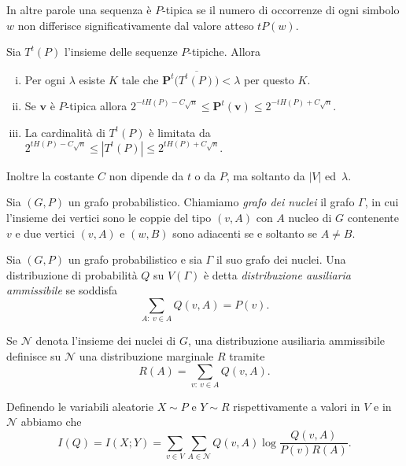 In altre parole una sequenza è \(P\)-tipica se il numero di occorrenze di ogni simbolo \(w\) non differisce significativamente dal valore atteso \(tP(w)\). 
\begin{lemma}
  \label{ptyplemma} Sia \(T^t(P)\) l'insieme delle sequenze \(P\)-tipiche. Allora 
  \begin{enumerate}[(i)]
  \item Per ogni \(\lambda\) esiste \(K\) tale che \(\mathbf{P}^t\big(\overline{T^{t}(P)}\big)<\lambda\) per questo \(K\). 
  \item Se \(\mathbf{v}\) è \(P\)-tipica allora \(2^{-tH(P)-C\sqrt{n}}\le \mathbf{P}^t(\mathbf{v})\le2^{-tH(P)+C\sqrt{n}}.\) 
  \item La cardinalità di \(T^{t}(P)\) è limitata da \(2^{tH(P)-C\sqrt{n}}\le |T^{t}(P)|\le 2^{tH(P)+C\sqrt{n}}.\) 
  \end{enumerate}
  Inoltre la costante \(C\) non dipende da \(t\) o da \(P\), ma soltanto da \(|V|\) ed\ \(\lambda\). 
\end{lemma}
\begin{definition}
  Sia \((G,P)\) un grafo probabilistico. Chiamiamo \emph{grafo dei nuclei} il grafo \(\Gamma\), in cui l'insieme dei vertici sono le coppie del tipo \((v,A)\) con \(A\) nucleo di \(G\) contenente \(v\) e due vertici \((v,A)\) e \((w,B)\) sono adiacenti se e soltanto se \(A\neq B\). 
\end{definition}
\begin{definition}
  Sia \((G,P)\) un grafo probabilistico e sia \(\Gamma\) il suo grafo dei nuclei. Una distribuzione di probabilità \(Q\) su \(V(\Gamma)\) è detta \emph{distribuzione ausiliaria ammissibile} se soddisfa 
  \begin{equation}
    \label{eq:preimage} \sum_{A:\ v\in A} Q(v,A) = P(v). 
  \end{equation}
\end{definition}

Se \(\mathcal{N}\) denota l'insieme dei nuclei di \(G\), una distribuzione ausiliaria ammissibile definisce su \(\mathcal{N}\) una distribuzione marginale \(R\) tramite 
\begin{equation}
  \label{eq:margdist} R(A)=\sum_{v:\ v\in A} Q(v,A). 
\end{equation}

Definendo le variabili aleatorie \(X\sim P\) e \(Y\sim R\) rispettivamente a valori in \(V\) e in \(\mathcal{N}\) abbiamo che 
\begin{equation}
  \label{eq:continuous} I(Q)=I(X;Y)=\sum_{v\in V}\sum_{A\in \mathcal{N}} Q(v,A)\log{\frac{Q(v,A)}{P(v)R(A)}}. 
\end{equation}

